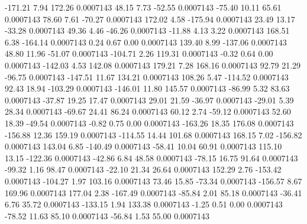      -171.21        7.94      172.26     0.0007143
       48.15        7.73      -52.55     0.0007143
      -75.40       10.11       65.61     0.0007143
       78.60        7.61      -70.27     0.0007143
      172.02        4.58     -175.94     0.0007143
       23.49       13.17      -33.28     0.0007143
       49.36        4.46      -46.26     0.0007143
      -11.88        4.13        3.22     0.0007143
      168.51        6.38     -164.14     0.0007143
        0.24        0.67        0.00     0.0007143
      139.40        8.99     -137.06     0.0007143
       48.80       11.96      -51.07     0.0007143
     -104.71        2.26      119.31     0.0007143
       -0.32        0.64        0.00     0.0007143
     -142.03        4.53      142.08     0.0007143
      179.21        7.28      168.16     0.0007143
       92.79       21.29      -96.75     0.0007143
     -147.51       11.67      134.21     0.0007143
      108.26        5.47     -114.52     0.0007143
       92.43       18.94     -103.29     0.0007143
     -146.01       11.80      145.57     0.0007143
      -86.99        5.32       83.63     0.0007143
      -37.87       19.25       17.47     0.0007143
       29.01       21.59      -36.97     0.0007143
      -29.01        5.39       28.34     0.0007143
      -69.67       24.41       86.24     0.0007143
       60.12        2.74      -59.12     0.0007143
       52.60       18.39      -49.54     0.0007143
       -0.82        0.75        0.00     0.0007143
     -163.26       18.35      176.08     0.0007143
     -156.88       12.36      159.19     0.0007143
     -114.55       14.44      101.68     0.0007143
      168.15        7.02     -156.82     0.0007143
      143.04        6.85     -140.49     0.0007143
      -58.41       10.04       60.91     0.0007143
      115.10       13.15     -122.36     0.0007143
      -42.86        6.84       48.58     0.0007143
      -78.15       16.75       91.64     0.0007143
      -99.32        1.16       98.47     0.0007143
      -22.10       21.34       26.64     0.0007143
      152.29        2.76     -153.42     0.0007143
     -104.27        1.97      103.16     0.0007143
       73.46       15.85      -73.34     0.0007143
     -156.57        8.67      169.96     0.0007143
      177.04        2.38     -167.49     0.0007143
      -85.84        2.01       85.18     0.0007143
      -36.41        6.76       35.72     0.0007143
     -133.15        1.94      133.38     0.0007143
       -1.25        0.51        0.00     0.0007143
      -78.52       11.63       85.10     0.0007143
      -56.84        1.53       55.00     0.0007143
